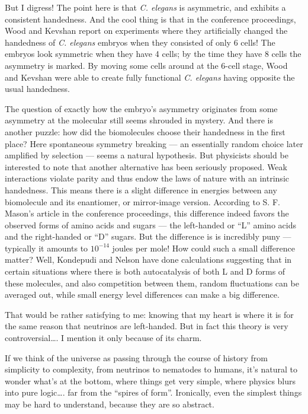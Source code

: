 \documentclass{article}
\begin{document}
But I digress! The point here is that \emph{C. elegans} is asymmetric,
and exhibits a consistent handedness. And the cool thing is that in the
conference proceedings, Wood and Kevshan report on experiments where
they artificially changed the handedness of \emph{C. elegans} embryos
when they consisted of only 6 cells! The embryos look symmetric when
they have 4 cells; by the time they have 8 cells the asymmetry is
marked. By moving some cells around at the 6-cell stage, Wood and
Kevshan were able to create fully functional \emph{C. elegans} having
opposite the usual handedness.

The question of exactly how the embryo's asymmetry originates from some
asymmetry at the molecular still seems shrouded in mystery. And there is
another puzzle: how did the biomolecules choose their handedness in the
first place? Here spontaneous symmetry breaking --- an essentially
random choice later amplified by selection --- seems a natural
hypothesis. But physicists should be interested to note that another
alternative has been seriously proposed. Weak interactions violate
parity and thus endow the laws of nature with an intrinsic handedness.
This means there is a slight difference in energies between any
biomolecule and its enantiomer, or mirror-image version. According to S.
F. Mason's article in the conference proceedings, this difference indeed
favors the observed forms of amino acids and sugars --- the left-handed
or ``L'' amino acids and the right-handed or ``D'' sugars. But the
difference is is incredibly puny --- typically it amounts to
\(10^{-14}\) joules per mole! How could such a small difference matter?
Well, Kondepudi and Nelson have done calculations suggesting that in
certain situations where there is both autocatalysis of both L and D
forms of these molecules, and also competition between them, random
fluctuations can be averaged out, while small energy level differences
can make a big difference.

That would be rather satisfying to me: knowing that my heart is where it
is for the same reason that neutrinos are left-handed. But in fact this
theory is very controversial\ldots. I mention it only because of its
charm.

If we think of the universe as passing through the course of history
from simplicity to complexity, from neutrinos to nematodes to humans,
it's natural to wonder what's at the bottom, where things get very
simple, where physics blurs into pure logic\ldots. far from the ``spires
of form''. Ironically, even the simplest things may be hard to
understand, because they are so abstract.
\end{document}
